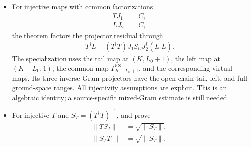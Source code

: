 \documentclass{article}
\begin{document}
\begin{itemize}
    \item For injective maps with common factorizations
          \begin{align}
              TJ_1
               & =C,
              \label{eq:cpgsv21_martingale_overlap_common_factorization_tail} \\
              LJ_2
               & =C,
              \label{eq:cpgsv21_martingale_overlap_common_factorization_left}
          \end{align}
          the theorem
          factors the projector residual through
          \begin{align}
              T^\dagger L
              -(T^\dagger T)J_1S_CJ_2^\dagger(L^\dagger L).
              \label{eq:cpgsv21_martingale_overlap_projector_residual_virtual_factor}
          \end{align}
          The specialization
           uses the tail
          map at $(K,L_0+1)$, the left map at $(K+L_0,1)$, the common map
          $\Gamma_{K+L_0+1}^{\mathrm{ES}}$, and the corresponding virtual maps. Its
          three inverse-Gram projectors have the open-chain tail, left, and full
          ground-space ranges. All injectivity assumptions are explicit. This is an
          algebraic identity; a source-specific mixed-Gram estimate is still needed.

    \item For injective $T$ and $S_T=(T^\dagger T)^{-1}$,
           and
           prove
          \begin{align}
              \lVert TS_T\rVert
               & =\sqrt{\lVert S_T\rVert},
              \label{eq:cpgsv21_martingale_overlap_left_pseudoinverse_norm} \\
              \lVert S_TT^\dagger\rVert
               & =\sqrt{\lVert S_T\rVert}.
              \label{eq:cpgsv21_martingale_overlap_right_pseudoinverse_norm}
          \end{align}


\end{itemize}
\end{document}
